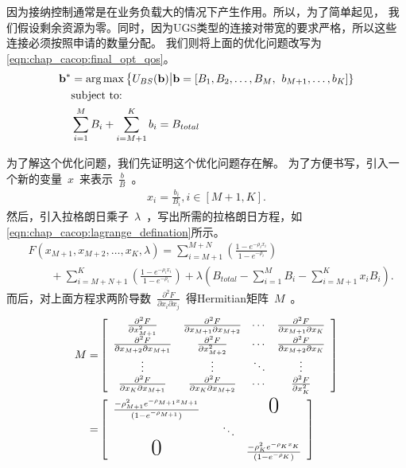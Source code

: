 因为接纳控制通常是在业务负载大的情况下产生作用。所以，为了简单起见，
我们假设剩余资源为零。同时，因为UGS类型的连接对带宽的要求严格，所以这些连接必须按照申请的数量分配。
我们则将上面的优化问题改写为 \eqref{eqn:chap_cacop:final_opt_qos}。
\begin{align}{}
\label{eqn:chap_cacop:final_opt_qos}
\mathbf{b}^* &= \arg \max \left\{ U_{BS}(\mathbf{b}) \big| \mathbf{b} = [B_1, B_2, \dots,B_M,\right.
 \left. b_{M+1}, \ldots, b_K] \right\} \\
&\text{subject to:}\notag \\
&\sum_{i=1}^M B_i + \sum_{i=M+1}^{K}b_i= B_{total} \notag
\end{align}

为了解这个优化问题，我们先证明这个优化问题存在解。
为了方便书写，引入一个新的变量~$x$~来表示~$\frac{b}{B}$~。
\begin{equation*}
\begin{split}
x_i = \frac{b_i}{B_i} , i \in [M+1, K].
\end{split}
\end{equation*}
然后，引入拉格朗日乘子~$\lambda$~，写出所需的拉格朗日方程，如
\eqref{eqn:chap_cacop:lagrange_defination}所示。
\begin{align}
&\displaystyle F(x_{M+1}, x_{M+2}, \dots, x_K, \lambda)= \sum^{M+N}_{i=M+1}
\left( \frac{1-e^{-\rho_i x_i}}{1-e^{-\rho_i}} \right) \nonumber \\
& \qquad \displaystyle +\sum_{i=M+N+1}^K\left( \frac{1-e^{-\rho_i x_i}}{1-e^{-\rho_i}} \right) 
 + \lambda
\left(B_{total} - \sum_{i=1}^M B_i -\sum^K_{i=M+1} x_i B_i \right).
\label{eqn:chap_cacop:lagrange_defination}
\end{align}
而后，对上面方程求两阶导数~$\frac{\partial ^2F}{\partial x_i \partial x_j}$~得Hermitian矩阵~${M}$~。
\begin{eqnarray*}
{M} = & 
\left[
\begin{array}{cccc}
\frac{\partial ^2F}{\partial x_{M+1} ^2} &\frac{\partial ^2F}{\partial x_{M+1} \partial x_{M+2}} & \dotsi & \frac{\partial ^2F}{\partial x_{M+1} \partial x_K} \\
\frac{\partial ^2F}{\partial x_{M+2} \partial x_{M+1}}& \frac{\partial ^2F}{\partial x_{M+2} ^2}& \dotsi & \frac{\partial ^2F}{\partial x_{M+2} \partial x_K}\\
\vdots & \vdots & \ddots & \vdots \\

\frac{\partial ^2F}{\partial x_{K} \partial x_{M+1} } &\frac{\partial ^2F}{\partial x_{K} \partial x_{M+2}} & \dotsi&\frac{\partial ^2F}{\partial x_K ^2}\\
\end{array}
\right] \\
=&
\left[
\begin{array}{cccc}
\frac{-\rho_{M+1}^2 e^{-\rho_{M+1} x_{M+1}}}{(1-e^{-\rho_{M+1}})} & & & \text{{\huge{0}}}\\
&&\ddots\\
\text{{\huge{0}}} &&& \frac{-\rho_{K}^2 e^{-\rho_{K} x_{K}}}{(1-e^{-\rho_{K}})}\\
\end{array}
\right] 
\end{eqnarray*}
